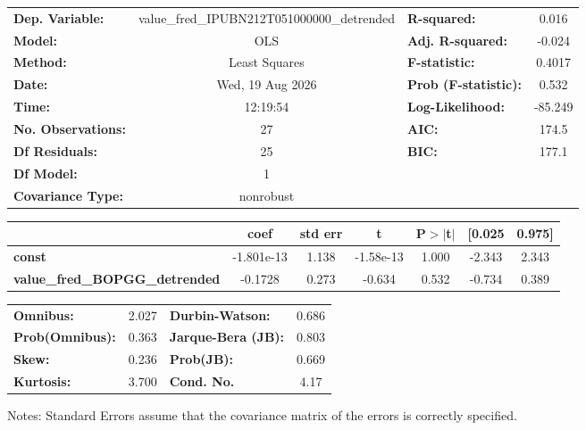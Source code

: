 \begin{center}
\begin{tabular}{lclc}
\toprule
\textbf{Dep. Variable:}                & value\_fred\_IPUBN212T051000000\_detrended & \textbf{  R-squared:         } &     0.016   \\
\textbf{Model:}                        &                    OLS                     & \textbf{  Adj. R-squared:    } &    -0.024   \\
\textbf{Method:}                       &               Least Squares                & \textbf{  F-statistic:       } &    0.4017   \\
\textbf{Date:}                         &              Wed, 19 Aug 2026              & \textbf{  Prob (F-statistic):} &    0.532    \\
\textbf{Time:}                         &                  12:19:54                  & \textbf{  Log-Likelihood:    } &   -85.249   \\
\textbf{No. Observations:}             &                       27                   & \textbf{  AIC:               } &     174.5   \\
\textbf{Df Residuals:}                 &                       25                   & \textbf{  BIC:               } &     177.1   \\
\textbf{Df Model:}                     &                        1                   & \textbf{                     } &             \\
\textbf{Covariance Type:}              &                 nonrobust                  & \textbf{                     } &             \\
\bottomrule
\end{tabular}
\begin{tabular}{lcccccc}
                                       & \textbf{coef} & \textbf{std err} & \textbf{t} & \textbf{P$> |$t$|$} & \textbf{[0.025} & \textbf{0.975]}  \\
\midrule
\textbf{const}                         &   -1.801e-13  &        1.138     & -1.58e-13  &         1.000        &       -2.343    &        2.343     \\
\textbf{value\_fred\_BOPGG\_detrended} &      -0.1728  &        0.273     &    -0.634  &         0.532        &       -0.734    &        0.389     \\
\bottomrule
\end{tabular}
\begin{tabular}{lclc}
\textbf{Omnibus:}       &  2.027 & \textbf{  Durbin-Watson:     } &    0.686  \\
\textbf{Prob(Omnibus):} &  0.363 & \textbf{  Jarque-Bera (JB):  } &    0.803  \\
\textbf{Skew:}          &  0.236 & \textbf{  Prob(JB):          } &    0.669  \\
\textbf{Kurtosis:}      &  3.700 & \textbf{  Cond. No.          } &     4.17  \\
\bottomrule
\end{tabular}
\end{center}

Notes: \newline
 [1] Standard Errors assume that the covariance matrix of the errors is correctly specified.